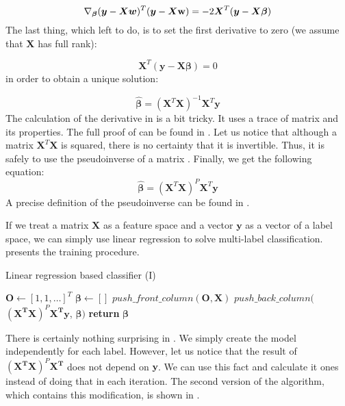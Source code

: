 \begin{equation}\label{eq:LR4}
    \nabla_{\boldsymbol{\beta}} (\boldsymbol{y}-\boldsymbol{X}\boldsymbol{w})^T(\boldsymbol{y}-\boldsymbol{X}\bold{w}) = -2\boldsymbol{X}^T(\boldsymbol{y}-\boldsymbol{X}\boldsymbol{\beta})
\end{equation}
The last thing, which left to do, is to set the first derivative to zero (we assume that $\boldsymbol{X}$ has full rank):

\begin{equation}\label{eq:LR4}
    \boldsymbol{X}^T(\boldsymbol{y}-\boldsymbol{X}\boldsymbol{\beta}) = 0
\end{equation}
in order to obtain a unique solution:

\begin{equation}\label{eq:LR5}
    \boldsymbol{\hat{\beta}} = (\boldsymbol{X}^T\boldsymbol{X})^{-1}\boldsymbol{X}^T\boldsymbol{y}
\end{equation}
The calculation of the derivative in  is a bit tricky. It uses a trace of matrix and its properties. The full proof of  can be found in . Let us notice that although a matrix $\boldsymbol{X}^T\boldsymbol{X}$ is squared, there is no certainty that it is invertible. Thus, it is safely to use the pseudoinverse of a matrix \citep{Trevor}. Finally, we get the following equation:
\begin{equation}\label{eq:LR_pseudo}
    \boldsymbol{\hat{\beta}} = (\boldsymbol{X}^T\boldsymbol{X})^{P}\boldsymbol{X}^T\boldsymbol{y}
\end{equation}
A precise definition of the pseudoinverse can be found in .

If we treat a matrix $\boldsymbol{X}$ as a feature space and a vector $\boldsymbol{y}$ as a vector of a label space, we can simply use linear regression to solve multi-label classification.  presents the training procedure.

\begin{algorithm}
    \caption{Linear regression based classifier (I)}\label{alg:LR0}
    \begin{algorithmic}[1]
        \State $\boldsymbol{O} \gets [1, 1, \ldots]^T$ 
        \State $\boldsymbol{\beta} \gets []$
        \State $push\_front\_column(\boldsymbol{O}, \boldsymbol{X})$
            \State $push\_back\_column($ $(\boldsymbol{X^T}\boldsymbol{X})^P\boldsymbol{X^T}\boldsymbol{y}$, $\boldsymbol{\beta})$ 
        \EndFor
        \State \textbf{return} $\boldsymbol{\beta}$
    \EndFunction
    \end{algorithmic}
\end{algorithm}
There is certainly nothing surprising in . We simply create the model independently for each label. However, let us notice that the result of $(\boldsymbol{X^T}\boldsymbol{X})^P\boldsymbol{X^T}$ does not depend on $\boldsymbol{y}$. We can use this fact and calculate it ones instead of doing that in each iteration. The second version of the algorithm, which contains this modification, is shown in . 

